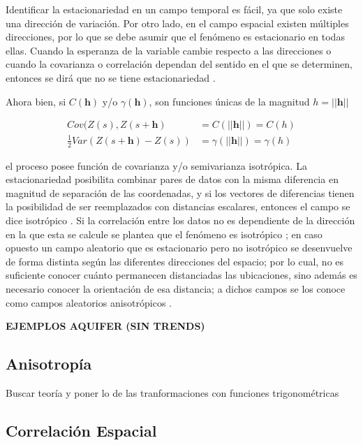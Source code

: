 \documentclass[
]{book}
\begin{document}
Identificar la estacionariedad en un campo temporal es fácil, ya que solo existe una dirección de variación. Por otro lado, en el campo espacial existen múltiples direcciones, por lo que se debe asumir que el fenómeno es estacionario en todas ellas. Cuando la esperanza de la variable cambie respecto a las direcciones o cuando la covarianza o correlación dependan del sentido en el que se determinen, entonces se dirá que no se tiene estacionariedad \citep{Ramon}.

Ahora bien, si \(C(\textbf{h})\) y/o \(\gamma(\textbf{h})\), son funciones únicas de la magnitud \(h=||\textbf{h}||\)

\begin{align}
    Cov(Z(s),Z(s+\textbf{h})&= C(||\textbf{h}||)= C(h)\\
    \frac{1}{2} Var(Z(s+\textbf{h})-Z(s))&=\gamma(||\textbf{h}||)=\gamma(h)
\end{align}

el proceso posee función de covarianza y/o semivarianza isotrópica. La estacionariedad posibilita combinar pares de datos con la misma diferencia en magnitud de separación de las coordenadas, y si los vectores de diferencias tienen la posibilidad de ser reemplazados con distancias escalares, entonces el campo se dice isotrópico \citep{marta}. Si la correlación entre los datos no es dependiente de la dirección en la que esta se calcule se plantea que el fenómeno es isotrópico \citep{Ramon}; en caso opuesto un campo aleatorio que es estacionario pero no isotrópico se desenvuelve de forma distinta según las diferentes direcciones del espacio; por lo cual, no es suficiente conocer cuánto permanecen distanciadas las ubicaciones, sino además es necesario conocer la orientación de esa distancia; a dichos campos se los conoce como campos aleatorios anisotrópicos \citep{marta}.

\textbf{EJEMPLOS AQUIFER (SIN TRENDS)}

\hypertarget{anisotropuxeda}{%
\subsection{Anisotropía}\label{anisotropuxeda}}

Buscar teoría y poner lo de las tranformaciones con funciones trigonométricas

\hypertarget{correlaciuxf3n-espacial}{%
\subsection{Correlación Espacial}\label{correlaciuxf3n-espacial}}
\end{document}
